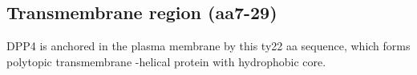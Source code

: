 \subsection{Transmembrane region (aa7-29)}

DPP4 is anchored in the plasma membrane by this ty22 aa sequence, which forms polytopic transmembrane \alpha-helical protein with hydrophobic core.~\cite{Hong_1990}